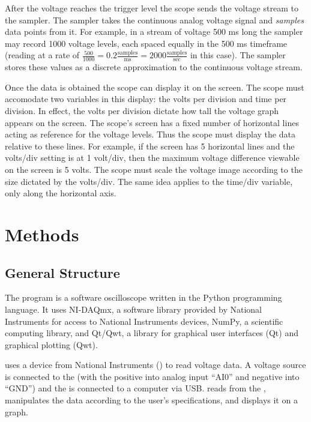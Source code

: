 \documentclass[12pt,reqno]{amsart}
\begin{document}
After the voltage reaches the trigger level the scope sends the voltage stream to the sampler. The sampler takes the continuous analog voltage signal and \textit{samples} data points from it. For example, in a stream of voltage 500 ms long the sampler may record 1000 voltage levels, each spaced equally in the 500 ms timeframe (reading at a rate of $\frac{500}{1000} = 0.2 \frac{\textrm{samples}}{\textrm{ms}} = 2000 \frac{\textrm{samples}}{\textrm{sec}}$ in this case). The sampler stores these values as a discrete approximation to the continuous voltage stream.

Once the data is obtained the scope can display it on the screen. The scope must accomodate two variables in this display: the volts per division and time per division. In effect, the volts per division dictate how tall the voltage graph appears on the screen. The scope's screen has a fixed number of horizontal lines acting as reference for the voltage levels. Thus the scope must display the data relative to these lines. For example, if the screen has 5 horizontal lines and the volts/div setting is at 1 volt/div, then the maximum voltage difference viewable on the screen is 5 volts. The scope must scale the voltage image according to the size dictated by the volts/div. The same idea applies to the time/div variable, only along the horizontal axis.

\section{Methods}

\subsection{General Structure}
The \progname{} program is a software oscilloscope written in the Python programming language. It uses NI-DAQmx, a software library provided by National Instruments for access to National Instruments devices, NumPy, a scientific computing library, and Qt/Qwt, a library for graphical user interfaces (Qt) and graphical plotting (Qwt).

\progname{} uses a device from National Instruments (\device{}) to read voltage data. A voltage source is connected to the \device{} (with the positive into analog input ``AI0'' and negative into ``GND'') and the \device{} is connected to a computer via USB. \progname{} reads from the \device{}, manipulates the data according to the user's specifications, and displays it on a graph.
\end{document}
